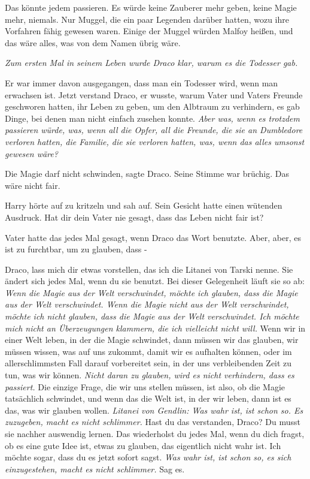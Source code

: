 Das könnte jedem passieren. Es würde keine Zauberer mehr geben, keine Magie
mehr, niemals. Nur Muggel, die ein paar Legenden darüber hatten, wozu ihre
Vorfahren fähig gewesen waren. Einige der Muggel würden Malfoy heißen, und das
wäre alles, was von dem Namen übrig wäre.

\emph{Zum ersten Mal in seinem Leben wurde Draco klar, warum es die Todesser
gab.}

Er war immer davon ausgegangen, dass man ein Todesser wird, wenn man erwachsen
ist. Jetzt verstand Draco, er wusste, warum Vater und Vaters Freunde geschworen
hatten, ihr Leben zu geben, um den Albtraum zu verhindern, es gab Dinge, bei
denen man nicht einfach zusehen konnte. \emph{Aber was, wenn es trotzdem
passieren würde, was, wenn all die Opfer, all die Freunde, die sie an Dumbledore
verloren hatten, die Familie, die sie verloren hatten, was, wenn das alles
umsonst gewesen wäre? }

\glqq Die Magie darf nicht schwinden\grqq{}, sagte Draco. Seine Stimme war
brüchig. \glqq Das wäre nicht fair.\grqq{}

Harry hörte auf zu kritzeln und sah auf. Sein Gesicht hatte einen wütenden
Ausdruck. \glqq Hat dir dein Vater nie gesagt, dass das Leben nicht fair
ist?\grqq{}

Vater hatte das jedes Mal gesagt, wenn Draco das Wort benutzte. \glqq Aber,
aber, es ist zu furchtbar, um zu glauben, dass -\grqq{}

\glqq Draco, lass mich dir etwas vorstellen, das ich die Litanei von Tarski
nenne. Sie ändert sich jedes Mal, wenn du sie benutzt. Bei dieser Gelegenheit
läuft sie so ab: \emph{Wenn die Magie aus der Welt verschwindet, möchte ich
glauben, dass die Magie aus der Welt verschwindet. Wenn die Magie nicht aus der
Welt verschwindet, möchte ich nicht glauben, dass die Magie aus der Welt
verschwindet. Ich möchte mich nicht an Überzeugungen klammern, die ich
vielleicht nicht will.} Wenn wir in einer Welt leben, in der die Magie
schwindet, dann müssen wir das glauben, wir müssen wissen, was auf uns zukommt,
damit wir es aufhalten können, oder im allerschlimmsten Fall darauf vorbereitet
sein, in der uns verbleibenden Zeit zu tun, was wir können. \emph{Nicht daran zu
glauben, wird es nicht verhindern, dass es passiert.} Die einzige Frage, die wir
uns stellen müssen, ist also, ob die Magie tatsächlich schwindet, und wenn das
die Welt ist, in der wir leben, dann ist es das, was wir glauben wollen.
\emph{Litanei von Gendlin: Was wahr ist, ist schon so. Es zuzugeben, macht es
nicht schlimmer.} Hast du das verstanden, Draco? Du musst sie nachher auswendig
lernen. Das wiederholst du jedes Mal, wenn du dich fragst, ob es eine gute Idee
ist, etwas zu glauben, das eigentlich nicht wahr ist. Ich möchte sogar, dass du
es jetzt sofort sagst. \emph{Was wahr ist, ist schon so, es sich einzugestehen,
macht es nicht schlimmer.} Sag es.\grqq{}


